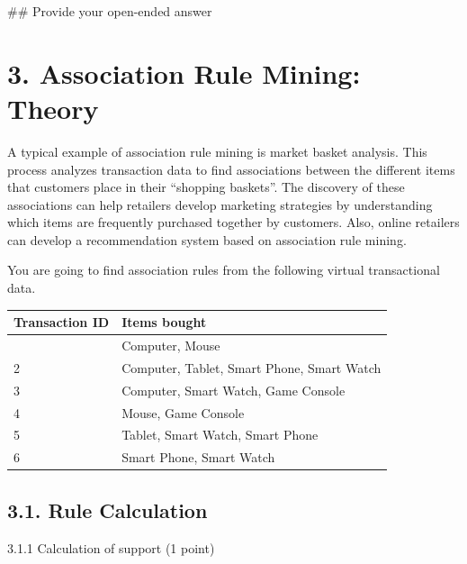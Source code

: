 \documentclass[
  letterpaper,
]{scrbook}
\newenvironment{Shaded}{\begin{snugshade}}{\end{snugshade}}
\newcommand{\CommentTok}[1]{\textcolor[rgb]{0.37,0.37,0.37}{#1}}
\newcounter{none} %
\begin{document}
\begin{Shaded}
\begin{Highlighting}[]
\CommentTok{\#\# Provide your open{-}ended answer}
\end{Highlighting}
\end{Shaded}

\section*{3. Association Rule Mining:
Theory}\label{association-rule-mining-theory}


A typical example of association rule mining is market basket analysis.
This process analyzes transaction data to find associations between the
different items that customers place in their ``shopping baskets''. The
discovery of these associations can help retailers develop marketing
strategies by understanding which items are frequently purchased
together by customers. Also, online retailers can develop a
recommendation system based on association rule mining.

You are going to find association rules from the following virtual
transactional data.

{\def\LTcaptype{none} %
\begin{longtable}[]{@{}ll@{}}
\toprule\noalign{}
Transaction ID & Items bought \\
\midrule\noalign{}
\endhead
\bottomrule\noalign{}
\endlastfoot
1 & Computer, Mouse \\
2 & Computer, Tablet, Smart Phone, Smart Watch \\
3 & Computer, Smart Watch, Game Console \\
4 & Mouse, Game Console \\
5 & Tablet, Smart Watch, Smart Phone \\
6 & Smart Phone, Smart Watch \\
\end{longtable}
}

\subsection*{3.1. Rule Calculation}\label{rule-calculation}

3.1.1 Calculation of support (1 point)
\end{document}
